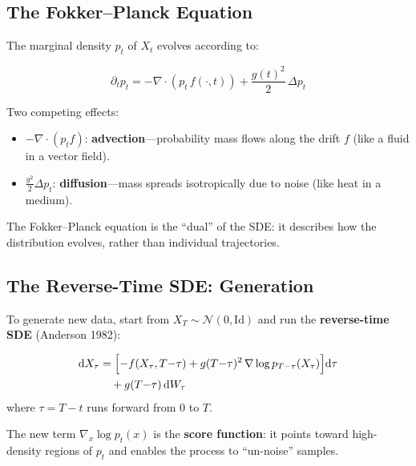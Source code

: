\documentclass[11pt, a4paper]{article}
\newcommand{\Id}{\mathrm{Id}}
\newcommand{\dd}{\mathrm{d}}
\newcommand{\grad}{\nabla}
\newcommand{\divg}{\nabla \cdot}
\theoremstyle{plain}
\theoremstyle{definition}
\theoremstyle{remark}
\begin{document}
\subsection{The Fokker--Planck Equation}

The marginal density $p_t$ of $X_t$ evolves according to:

\begin{thmbox}
\begin{equation}
  \partial_t p_t = -\divg(p_t\, f(\cdot, t)) + \frac{g(t)^2}{2}\,\Delta p_t
  \label{eq:fokker_planck}
\end{equation}
\end{thmbox}

\begin{intubox}
Two competing effects:
\begin{itemize}
  \item $-\divg(p_t f)$: \textbf{advection}---probability mass flows along the drift $f$ (like a fluid in a vector field).
  \item $\frac{g^2}{2}\Delta p_t$: \textbf{diffusion}---mass spreads isotropically due to noise (like heat in a medium).
\end{itemize}
The Fokker--Planck equation is the ``dual'' of the SDE: it describes how the distribution evolves, rather than individual trajectories.
\end{intubox}

\subsection{The Reverse-Time SDE: Generation}

To generate new data, start from $X_T \sim \mathcal{N}(0,\Id)$ and run the \textbf{reverse-time SDE} (Anderson 1982):

\begin{thmbox}
\begin{equation}
\begin{aligned}
  \dd X_\tau &= \Bigl[-f(X_\tau, T{-}\tau) + g(T{-}\tau)^2\,\grad \log p_{T-\tau}(X_\tau)\Bigr]\dd\tau \\
             &\quad + g(T{-}\tau)\,\dd W_\tau
\end{aligned}
  \label{eq:reverse_sde}
\end{equation}
where $\tau = T - t$ runs forward from 0 to $T$.
\end{thmbox}

The new term $\grad_x \log p_t(x)$ is the \textbf{score function}: it points toward high-density regions of $p_t$ and enables the process to ``un-noise'' samples.
\end{document}

